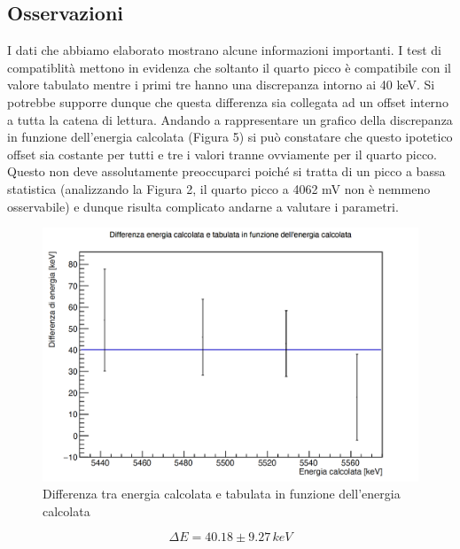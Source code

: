 \documentclass[a4paper,10pt]{article}
\begin{document}

\subsection{Osservazioni}
I dati che abbiamo elaborato mostrano alcune informazioni importanti. I test di compatiblit\`a mettono in evidenza che soltanto il quarto picco \`e compatibile con il valore tabulato mentre i primi tre hanno una discrepanza intorno ai 40 keV. Si potrebbe supporre dunque che questa differenza sia collegata ad un offset interno a tutta la catena di lettura. Andando a rappresentare un grafico della discrepanza in funzione dell'energia calcolata (Figura 5) si pu\`o constatare che questo ipotetico offset sia costante per tutti e tre i valori tranne ovviamente per il quarto picco. Questo non deve assolutamente preoccuparci poich\'e si tratta di un picco a bassa statistica (analizzando la Figura 2, il quarto picco a 4062 mV non \`e nemmeno osservabile) e dunque risulta complicato andarne a valutare i parametri.

\begin{figure}[H]
    \centering
    \includegraphics[scale=0.4]{discrepanza.png}
    \caption{Differenza tra energia calcolata e tabulata in funzione dell'energia calcolata}
\end{figure}

$$
    \Delta E = 40.18 \pm 9.27\, keV
$$
\end{document}
